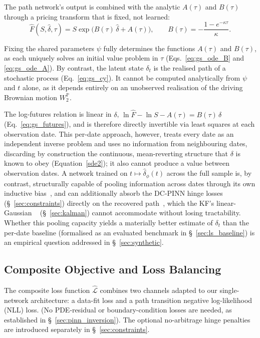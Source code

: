 \documentclass[11pt, a4paper]{article}
\begin{document}
The path network's output is combined with the analytic $A(\tau)$ and
$B(\tau)$ through a pricing transform that is fixed, not learned:
\begin{equation}
    \label{eq:pricing_transform}
    \hat{F}(S, \hat{\delta}, \tau) = S \exp\!\big(B(\tau)\,\hat{\delta} +
    A(\tau)\big), \qquad
    B(\tau) = -\frac{1-e^{-\kappa\tau}}{\kappa}.
\end{equation}

Fixing the shared parameters $\psi$ fully determines the functions $A(\tau)$ and $B(\tau)$, as each uniquely solves an initial value problem in $\tau$ (Eqs.~\ref{eq:gs_ode_B} and \ref{eq:gs_ode_A}). By contrast, the latent state $\delta_t$ is the realised path of a stochastic process (Eq.~\ref{eq:gs_cy}). It cannot be computed analytically from $\psi$ and $t$ alone, as it depends entirely on an unobserved realisation of the driving Brownian motion $W_2^{\mathbb{P}}$\cite{Schwartz1997TheHedging, duffie2000transform}.

The log-futures relation is linear in $\delta$,
$\ln\hat{F} - \ln S - A(\tau) = B(\tau)\,\delta$ (Eq.~\ref{eq:gs_futures}),
and is therefore directly invertible via least squares at each observation
date. This per-date approach, however, treats every date as an independent
inverse problem and uses no information from neighbouring dates, discarding by
construction the continuous, mean-reverting structure that $\delta$ is known to
obey (Equation~\ref{sde2}); it also cannot produce a value between observation
dates. A network trained on $t \mapsto \hat\delta_\phi(t)$ across the full
sample is, by contrast, structurally capable of pooling information across
dates through its own inductive bias~\cite{rahaman2019spectral}, and can additionally absorb the DC-PINN
hinge losses (\S~\ref{sec:constraints}) directly on the recovered path~\cite{Hoshisashi2024Physics-InformedPDEs},
which the KF's linear-Gaussian ~\cite{krul2008calibration} (\S~\ref{sec:kalman})
cannot accommodate without losing tractability. Whether this pooling capacity
yields a materially better estimate of $\delta_t$ than the per-date baseline
(formalised as an evaluated benchmark in \S~\ref{sec:ls_baseline})
is an empirical question addressed in \S~\ref{sec:synthetic}.

\subsection{Composite Objective and Loss Balancing}
\label{sec:multi_obj}

The composite loss function $\hat{\mathcal{L}}$ combines two channels adapted to our single-network architecture: a data-fit loss and a path transition negative log-likelihood (NLL) loss. (No PDE-residual or boundary-condition losses are needed, as established in \S~\ref{sec:pinn_inversion}). The optional no-arbitrage hinge penalties are introduced separately in \S~\ref{sec:constraints}.
\end{document}
